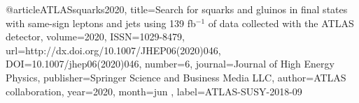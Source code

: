 @article{ATLASsquarks2020, 
    title={Search for squarks and gluinos in final states with same-sign leptons and jets using 139 fb$^{−1}$ of data collected with the ATLAS detector}, 
    volume={2020}, 
    ISSN={1029-8479}, 
    url={http://dx.doi.org/10.1007/JHEP06(2020)046}, 
    DOI={10.1007/jhep06(2020)046}, 
    number={6}, 
    journal={Journal of High Energy Physics}, 
    publisher={Springer Science and Business Media LLC}, 
    author={ATLAS collaboration}, 
    year={2020}, 
    month=jun ,
    label={ATLAS-SUSY-2018-09}
}

